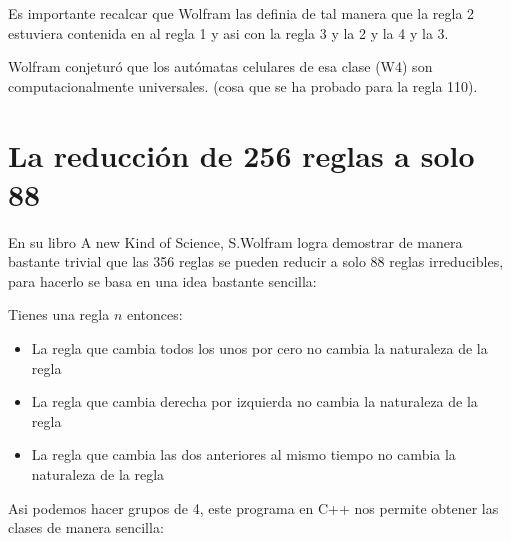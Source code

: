 \documentclass[12pt, fleqn]{report}                             %
\theoremstyle{break}                                            %
\begin{document}
      \cite{Kari}

      Es importante recalcar que Wolfram las definia de tal manera que la regla 2 estuviera
      contenida en al regla 1 y asi con la regla 3 y la 2 y la 4 y la 3.

      Wolfram conjeturó que los autómatas celulares de esa clase (W4) son computacionalmente universales.
      (cosa que se ha probado para la regla 110).

  \chapter{La reducción de 256 reglas a solo 88}

      En su libro A new Kind of Science, S.Wolfram \cite{Wolfram} logra demostrar de manera bastante trivial
      que las 356 reglas se pueden reducir a solo 88 reglas irreducibles, para hacerlo se basa en una idea
      bastante sencilla:

      Tienes una regla $n$ entonces:
      \begin{itemize}
        \item La regla que cambia todos los unos por cero no cambia la naturaleza de la regla
        \item La regla que cambia derecha por izquierda no cambia la naturaleza de la regla
        \item La regla que cambia las dos anteriores al mismo tiempo no cambia la naturaleza de la regla
      \end{itemize}

      Asi podemos hacer grupos de 4, este programa en C++ nos permite obtener las clases de manera sencilla:
\end{document}
